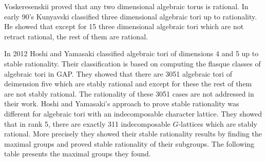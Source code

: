 \documentclass[12pt]{article}
\theoremstyle{plain}
\theoremstyle{definition}
\begin{document}
Voskeresenskii proved that any two dimensional algebraic torus is rational. 
In early 90's Kunyavski classified three dimensional algebraic tori up to 
rationality. He showed that except for 15 three dimensional algebraic tori 
which are not retract rational, the rest of them are rational.

In 2012 Hoshi and Yamasaki \cite{Hoshi} 
classified algebraic tori of dimensions 4 and 5 up to stable rationality. 
Their classification is based on computing the flasque classes of algebraic 
tori in GAP. They showed that there are 3051 algebraic tori of deimension five 
which are stably rational and except for these the rest of them are not stably rational.
The rationality of these 3051 cases are not addressed in their work. Hoshi and 
Yamasaki's approach to prove stable rationality was different for algebraic tori with
an indecomposable character lattice. They showed that in rank 5, there are exactly 311 indecomposable 
$G$-lattices which are stably rational. More precisely they showed their 
stable rationality results by finding the maximal groups and proved stable rationality 
of their subgroups. The following table presents the maximal groups they found.
\end{document}
